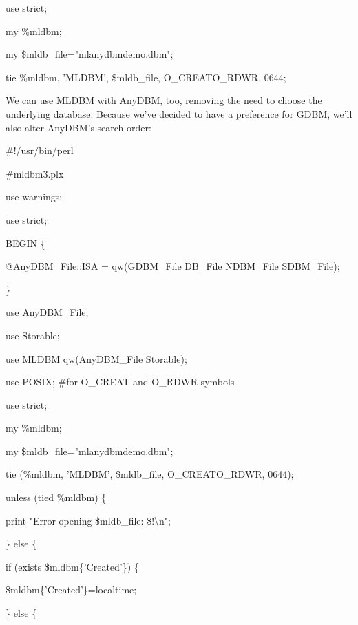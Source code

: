 \documentclass[a4paper,11pt]{book}
\begin{document}
\noindent use strict;

\noindent 

\noindent my \%mldbm;

\noindent my \$mldb\_file="mlanydbmdemo.dbm";

\noindent 

\noindent tie \%mldbm, 'MLDBM', \$mldb\_file, O\_CREAT\textbar O\_RDWR, 0644;

\noindent 

\noindent We can use MLDBM with AnyDBM, too, removing the need to choose the underlying database. Because we've decided to have a preference for GDBM, we'll also alter AnyDBM's search order:

\noindent 

\noindent \#!/usr/bin/perl

\noindent \#mldbm3.plx

\noindent use warnings;

\noindent use strict;

\noindent BEGIN \{

\noindent @AnyDBM\_File::ISA = qw(GDBM\_File DB\_File NDBM\_File SDBM\_File);

\noindent \}

\noindent 

\noindent use AnyDBM\_File;

\noindent use Storable;

\noindent use MLDBM qw(AnyDBM\_File Storable);

\noindent use POSIX; \#for O\_CREAT and O\_RDWR symbols

\noindent use strict;

\noindent 

\noindent my \%mldbm;

\noindent my \$mldb\_file="mlanydbmdemo.dbm";

\noindent 

\noindent tie (\%mldbm, 'MLDBM', \$mldb\_file, O\_CREAT\textbar O\_RDWR, 0644);

\noindent 

\noindent unless (tied \%mldbm) \{

\noindent print "Error opening \$mldb\_file: \$!\textbackslash n";

\noindent \} else \{

\noindent if (exists \$mldbm\{'Created'\}) \{

\noindent \$mldbm\{'Created'\}=localtime;

\noindent \} else \{
\end{document}
